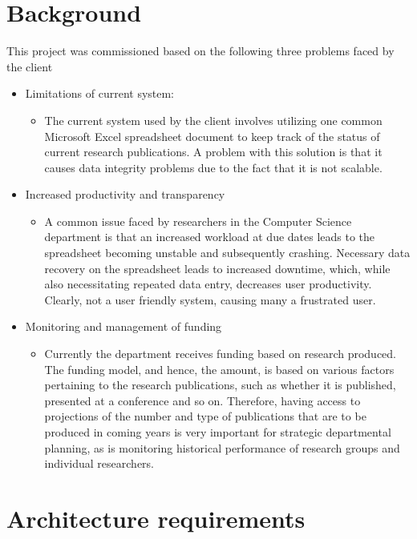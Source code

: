 \documentclass[a4paper,10pt]{article}
\begin{document}
\section{Background}
This project was commissioned based on the following three problems faced by the client
\begin{itemize}
\item Limitations of current system:
	\begin{itemize}
	\item The current system used by the client involves utilizing one common Microsoft Excel spreadsheet document to keep track of the status of current research publications. A problem with this solution is that it causes data integrity problems due to the fact that it is not scalable.
	\end{itemize}
\item Increased productivity and transparency
	\begin{itemize}
	\item  A common issue faced by researchers in the Computer Science department is that an increased workload at due dates leads to the spreadsheet becoming unstable and subsequently crashing. Necessary data recovery on the spreadsheet leads to increased downtime, which, while also necessitating repeated data entry, decreases user productivity. Clearly, not a user friendly system, causing many a frustrated user.
	\end{itemize}

\item Monitoring and management of funding
	\begin{itemize}
	\item Currently the department receives funding based on research produced. The funding model, and hence, the amount, is based on various factors pertaining to the research publications, such as whether it is published, presented at a conference and so on. Therefore, having access to projections of the number and type of publications that are to be produced in coming years is very important for strategic departmental planning, as is monitoring historical performance of research groups and individual researchers.
	\end{itemize}
\end{itemize}

\section{Architecture requirements}
\end{document}
